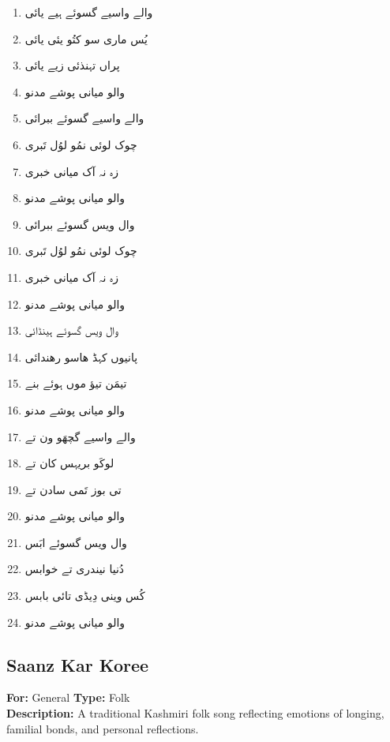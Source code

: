 \documentclass[12pt]{article}
\newcommand{\bigarabic}[1]{\fontsize{16pt}{18pt}\selectfont \textarabic{#1}}
\begin{document}
\begin{multicols}{2}
\begin{RTL}
\begin{enumerate}[leftmargin=*, label=\arabic*., font=\fontsize{16pt}{18pt}\selectfont]
  \item \bigarabic{والے واسیے گسوئے ہیے یائی}
  \item \bigarabic{یُس ماری سو کتُو یئی یائی}
  \item \bigarabic{پراں تہنذئی زیے یائی}
  \item \bigarabic{والو میانی پوشے مدنو}
  \item \bigarabic{والے واسیے گسوئے ببرائی}
  \item \bigarabic{چوک لوئی نمُو لوُل تَبری}
  \item \bigarabic{زہ نہ آک میانی خبری}
  \item \bigarabic{والو میانی پوشے مدنو}
  \item \bigarabic{وال ویس گسوئے ببرائی}
  \item \bigarabic{چوک لوئی نمُو لوُل تَبری}
  \item \bigarabic{زہ نہ آک میانی خبری}
  \item \bigarabic{والو میانی پوشے مدنو}
  \item \bigarabic{وال ویس گسوئے ہینڈائی}
  \item \bigarabic{پانیوں کہڈ ھاسو رھندائی}
  \item \bigarabic{تیمَن تیؤ موں ہوئے بنے}
  \item \bigarabic{والو میانی پوشے مدنو}
  \item \bigarabic{والے واسیے گچھَو ون تے}
  \item \bigarabic{لوکَو بریہس کان تے}
  \item \bigarabic{تی بوز تَمی سادن تے}
  \item \bigarabic{والو میانی پوشے مدنو}
  \item \bigarabic{وال ویس گسوئے ابَس}
  \item \bigarabic{دُنیا نیندری تے خوابس}
  \item \bigarabic{کُس وینی دِیڈی تائی بابس}
  \item \bigarabic{والو میانی پوشے مدنو}
\end{enumerate}
\end{RTL}
\end{multicols}

\subsection*{Saanz Kar Koree}
\textbf{For:} General \quad \textbf{Type:} Folk\\
\textbf{Description:} A traditional Kashmiri folk song reflecting emotions of longing, familial bonds, and personal reflections.
\end{document}
